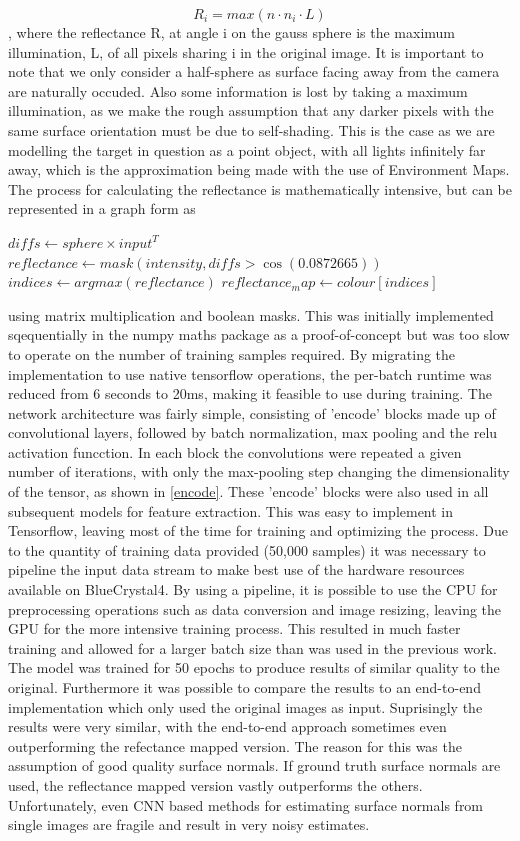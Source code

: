 \documentclass[ %
                    author={Gavin Parker},
                supervisor={Dr. Neill Campbell},
                    degree={MEng},
                     title={Deep Siamese Networks for Illumination Estimation from Stereo Images},
                  subtitle={},
                      type={research},
                      year={2018} ]{dissertation}
\begin{document}
\[ R_i = max(n\cdot n_i \cdot L)\],
where the reflectance R, at angle i on the gauss sphere is the maximum illumination, L, of all pixels sharing i in the original image. It is important to note that we only consider a half-sphere as surface facing away from the camera are naturally occuded. Also some information is lost by taking a maximum illumination, as we make the rough assumption that any darker pixels with the same surface orientation must be due to self-shading. This is the case as we are modelling the target in question as a point object, with all lights infinitely far away, which is the approximation being made with the use of Environment Maps.
\newline
The process for calculating the reflectance is mathematically intensive, but can be represented in a graph form as
\begin{algorithm}
$ diffs \leftarrow sphere \times input^T $\;
$ reflectance \leftarrow mask(intensity, diffs > \cos(0.0872665)) $\;
$ indices \leftarrow argmax(reflectance) $\;
$ reflectance_map \leftarrow colour[indices] $\;
\end{algorithm}
using matrix multiplication and boolean masks. This was initially implemented sqequentially in the numpy maths package as a proof-of-concept but was too slow to operate on the number of training samples required. By migrating the implementation to use native tensorflow operations, the per-batch runtime was reduced from 6 seconds to 20ms, making it feasible to use during training.
\newline
The network architecture was fairly simple, consisting of 'encode' blocks made up of convolutional layers, followed by batch normalization, max pooling and the relu activation funcction. In each block the convolutions were repeated a given number of iterations, with only the max-pooling step changing the dimensionality of the tensor, as shown in \ref{encode}. These 'encode' blocks were also used in all subsequent models for feature extraction. This was easy to implement in Tensorflow, leaving most of the time for training and optimizing the process. Due to the quantity of training data provided (50,000 samples) it was necessary to pipeline the input data stream to make best use of the hardware resources available on BlueCrystal4. By using a pipeline, it is possible to use the CPU for preprocessing operations such as data conversion and image resizing, leaving the GPU for the more intensive training process. This resulted in much faster training and allowed for a larger batch size than was used in the previous work. The model was trained for 50 epochs to produce results of similar quality to the original. Furthermore it was possible to compare the results to an end-to-end implementation which only used the original images as input. Suprisingly the results were very similar, with the end-to-end approach sometimes even outperforming the refectance mapped version. The reason for this was the assumption of good quality surface normals. If ground truth surface normals are used, the reflectance mapped version vastly outperforms the others. Unfortunately, even CNN based methods for estimating surface normals from single images are fragile and result in very noisy estimates.
\end{document}
